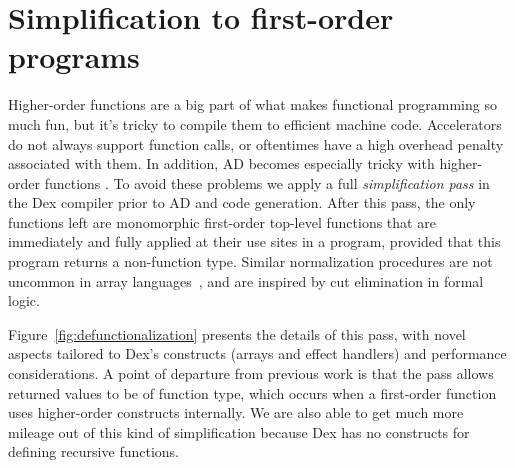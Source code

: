 \documentclass[acmsmall,screen,nonacm]{acmart}
\begin{document}
\section{Simplification to first-order programs}
\label{sec:defunctionalization}
\newcommand\eminor{E^\flat}
\newcommand\vminor{v^\flat}
\newcommand\tminor{\tau^\flat}
\newcommand\freevars[1]{{\tt free}(#1)}
\newcommand\boundvars[1]{{\tt bound}(#1)}
\newcommand\binders[1]{{\tt binders}(#1)}

Higher-order functions are a big part of what makes functional programming so
much fun, but it's tricky to compile them to efficient machine code.
Accelerators do not always support function calls, or oftentimes have a high overhead penalty associated with them. In addition, AD becomes especially tricky with higher-order functions \citep{manzyuk2019perturbationconfusion, ritchie2021higherorderad}.
To avoid these problems we apply a full {\em simplification pass} in the Dex compiler prior to AD and code generation. After this pass, the only functions left are monomorphic first-order top-level functions that are immediately and fully applied at their use sites in a program, provided that this program returns a non-function type. Similar normalization procedures are not uncommon in array languages~\cite{hovgaard2018high, najd+:everything-old}, and are inspired by cut elimination in formal logic.

Figure~\ref{fig:defunctionalization} presents the details of this pass, with novel aspects tailored to Dex's constructs (arrays and effect handlers) and performance considerations.
A point of departure from previous work is that the pass allows returned values to be of function type, which occurs when a first-order function uses higher-order constructs internally.
We are also able to get much more mileage out of this kind of simplification because Dex has no constructs for defining recursive functions.
\end{document}
